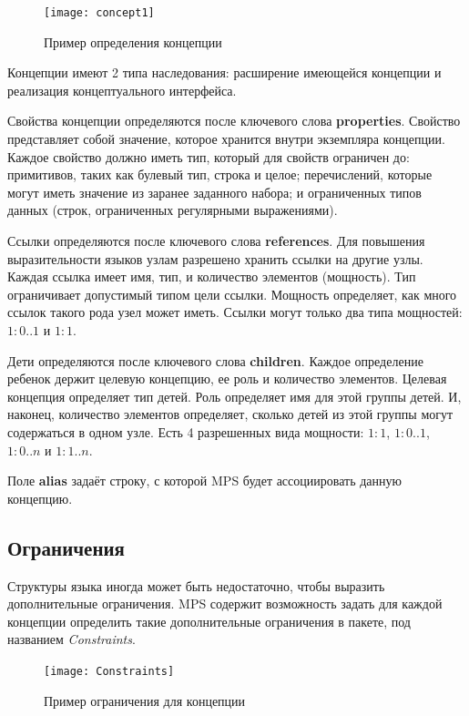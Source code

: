 			\begin{figure}[ht] 
				\center
				\texttt{[image: concept1]}
				\caption{Пример определения концепции} 
				\label{img:concept1}  
			\end{figure}
		
		Концепции имеют 2 типа наследования: расширение имеющейся концепции и реализация концептуального интерфейса. 
		
		Свойства концепции определяются после ключевого слова \textbf{properties}. Свойство представляет собой значение, которое хранится внутри экземпляра концепции. Каждое свойство должно иметь тип, который для свойств ограничен до: примитивов, таких как булевый тип, строка и целое; перечислений, которые могут иметь значение из заранее заданного набора; и ограниченных типов данных (строк, ограниченных регулярными выражениями).
		
		Ссылки определяются после ключевого слова \textbf{references}. Для повышения выразительности языков узлам разрешено хранить ссылки на другие узлы. Каждая ссылка имеет имя, тип, и количество элементов (мощность). Тип ограничивает допустимый типом цели ссылки. Мощность определяет, как много ссылок такого рода узел может иметь. Ссылки могут только два типа мощностей: $ 1:0..1 $ и $ 1: 1$.
		
		Дети определяются после ключевого слова \textbf{children}. Каждое определение ребенок держит целевую концепцию, ее роль и количество элементов. Целевая концепция определяет тип детей. Роль определяет имя для этой группы детей. И, наконец, количество элементов определяет, сколько детей из этой группы могут содержаться в одном узле. Есть 4 разрешенных вида мощности: $ 1: 1 $, $ 1: 0..1 $, $ 1: 0..n $ и $ 1: 1..n $.
		
		Поле \textbf{alias} задаёт строку, с которой MPS будет ассоциировать данную концепцию.
		
	\subsection{Ограничения}
		Структуры языка иногда может быть недостаточно, чтобы выразить дополнительные ограничения. MPS содержит возможность задать для каждой концепции определить такие дополнительные ограничения в пакете, под названием \textit{Constraints}.~\cite{mpssource}
		
		\begin{figure}[ht] 
			\center
			\texttt{[image: Constraints]}
			\caption{Пример ограничения для концепции} 
			\label{img:Constraints}  
		\end{figure}
	
